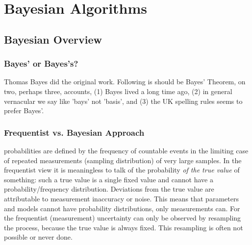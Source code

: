 

\part{Bayesian Algorithms}

\chapter{Bayesian Overview}
\label{chap:BayesianOverview}

\section{Bayes' or Bayes's?}

Thomas Bayes did the original work. 
Following \cite{MaeveMaddox2019} is should be Bayes' Theorem, on two, perhaps three, accounts, (1) Bayes lived a long time ago, (2) in general vernacular  we say like 'bays' not 'basis', and (3) the UK spelling rules seems to prefer Bayes'.

\section{Frequentist vs. Bayesian Approach}

 probabilities are defined by the frequency of countable events in the limiting case of repeated measurements (sampling distribution) of very large samples.
In the frequentist view it is meaningless to talk of the probability \textit{of the true value} of something: such a true value is a single fixed value  and cannot have a probability/frequency distribution.  Deviations from the true value are attributable to measurement inaccuracy or noise.
This means that parameters and models cannot have probability distributions, only measurements can. 
For the frequentist (measurement) uncertainty can only be observed by resampling the process, because the true value is always fixed. This resampling is often not possible or never done.\cite{McElreath2015,vanderPlasFreqBayes2014}

